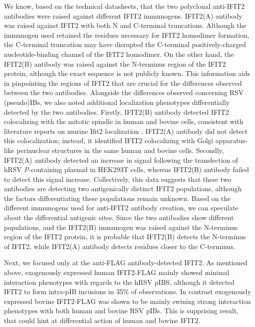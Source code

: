 We know, based on the technical datasheets, that the two polyclonal anti-IFIT2 antibodies were raised against different IFIT2 immunogens. IFIT2(A) antibody was raised against IFIT2 with both N and C-terminal truncations. Although the immunogen used retained the residues necessary for IFIT2 homodimer formation, the C-terminal truncation may have disrupted the C-terminal positively-charged nucleotide-binding channel of the IFIT2 homodimer. On the other hand, the IFIT2(B) antibody was raised against the N-terminus region of the IFIT2 protein, although the exact sequence is not publicly known. This information aids in pinpointing the regions of IFIT2 that are crucial for the differences observed between the two antibodies. Alongside the differences observed concerning RSV (pseudo)IBs, we also noted additional localization phenotypes differentially detected by the two antibodies. Firstly, IFIT2(B) antibody detected IFIT2 colocalizing with the mitotic spindle in human and bovine cells, consistent with literature reports on murine Ifit2 localization \cite{Saha2006IdentificationProtein}. IFIT2(A) antibody did not detect this colocalization; instead, it identified IFIT2 colocalizing with Golgi apparatus-like perinuclear structures in the same human and bovine cells. Secondly, IFIT2(A) antibody detected an increase in signal following the transfection of hRSV \textit{P}-containing plasmid in HEK293T cells, whereas IFIT2(B) antibody failed to detect this signal increase. Collectively, this data suggests that these two antibodies are detecting two antigenically distinct IFIT2 populations, although the factors differentiating these populations remain unknown. Based on the different immunogens used for anti-IFIT2 antibody creation, we can speculate about the differential antigenic sites. Since the two antibodies show different populations, and the IFIT2(B) immunogen was raised against the N-terminus region of the IFIT2 protein, it is probable that IFIT2(B) detects the N-terminus of IFIT2, while IFIT2(A) antibody detects residues closer to the C-terminus.

Next, we focused only at the anti-FLAG antibody-detected IFIT2. As mentioned above, exogenously expressed human IFIT2-FLAG mainly showed minimal interaction phenotypes with regards to the hRSV pIBS, although it detected IFIT2 to form intra-pIB incusions in 35\% of observations. In contrast exogenously expressed bovine IFIT2-FLAG was shown to be mainly swining strong interaction phenotypes with both human and bovine RSV pIBs. This is supprising result, that could hint at differential action of human and bovine IFIT2. 

